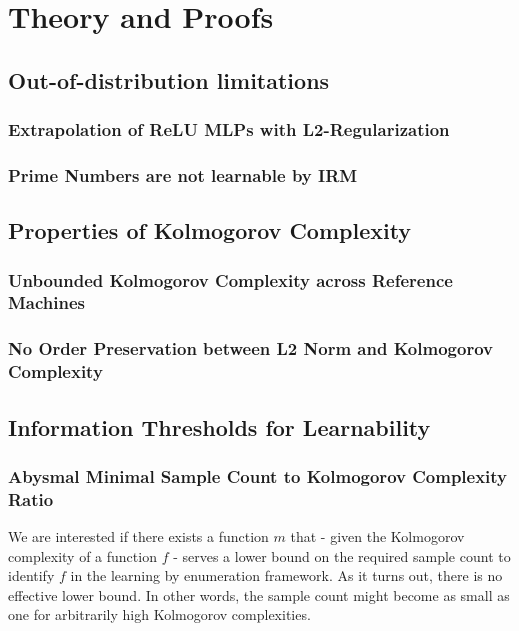 
\chapter{Theory and Proofs}

%
%
\section{Out-of-distribution limitations}
\subsection{Extrapolation of ReLU MLPs with L2-Regularization}
\subsection{Prime Numbers are not learnable by IRM}
\section{Properties of Kolmogorov Complexity}
\subsection{Unbounded Kolmogorov Complexity across Reference Machines}
\subsection{No Order Preservation between L2 Norm and Kolmogorov Complexity}
\section{Information Thresholds for Learnability}
\subsection{Abysmal Minimal Sample Count to Kolmogorov Complexity Ratio}
We are interested if there exists a function $m$ that - given the Kolmogorov complexity of a function $f$ - serves a lower bound on the required sample count to identify $f$ in the learning by enumeration framework. As it turns out, there is no effective lower bound. In other words, the sample count might become as small as one for arbitrarily high Kolmogorov complexities.

